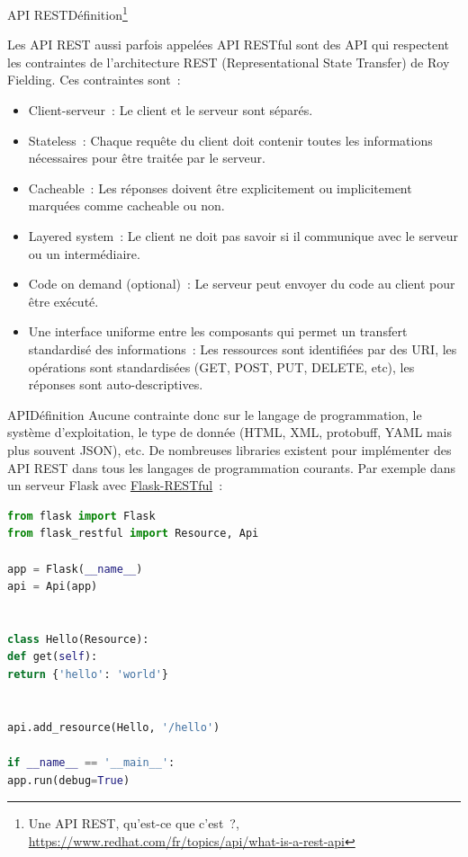 \documentclass{beamer}
\begin{document}
    \begin{frame}{API REST}{Définition\footnote{Une API REST, qu'est-ce que c'est~?, \url{https://www.redhat.com/fr/topics/api/what-is-a-rest-api}}}
        \begin{footnotesize}
            Les API REST aussi parfois appelées API RESTful sont des API qui respectent les contraintes de l'architecture REST (Representational State Transfer) de Roy Fielding.
            \bigbreak
            Ces contraintes sont~:
            \begin{itemize}
                \item Client-serveur~: Le client et le serveur sont séparés.
                \item Stateless~: Chaque requête du client doit contenir toutes les informations nécessaires pour être traitée par le serveur.
                \item Cacheable~: Les réponses doivent être explicitement ou implicitement marquées comme cacheable ou non.
                \item Layered system~: Le client ne doit pas savoir si il communique avec le serveur ou un intermédiaire.
                \item Code on demand (optional)~: Le serveur peut envoyer du code au client pour être exécuté.
                \item Une interface uniforme entre les composants qui permet un transfert standardisé des informations~: Les ressources sont identifiées par des URI, les opérations sont standardisées (GET, POST, PUT, DELETE, etc), les réponses sont auto-descriptives.
            \end{itemize}
        \end{footnotesize}
    \end{frame}

    \begin{frame}[fragile]{API}{Définition}
        Aucune contrainte donc sur le langage de programmation, le système d'exploitation, le type de donnée (HTML, XML, protobuff, YAML mais plus souvent JSON), etc.
        \bigbreak
        De nombreuses libraries existent pour implémenter des API REST dans tous les langages de programmation courants.
        \bigbreak
        Par exemple dans un serveur Flask avec \href{https://flask-restful.readthedocs.io/en/latest/}{Flask-RESTful}~:
        \begin{lstlisting}[language=python,basicstyle=\ttfamily\tiny]
from flask import Flask
from flask_restful import Resource, Api

app = Flask(__name__)
api = Api(app)


class Hello(Resource):
def get(self):
return {'hello': 'world'}


api.add_resource(Hello, '/hello')

if __name__ == '__main__':
app.run(debug=True)
        \end{lstlisting}
    \end{frame}
\end{document}
